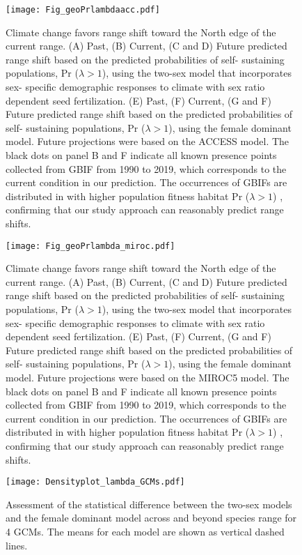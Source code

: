 \documentclass[9pt,twoside,lineno]{pnas-new}
\begin{document}
\begin{figure}
\centering
\texttt{[image: Fig\_geoPrlambdaacc.pdf]}
\caption{Climate change favors range shift toward the North edge of the current range.
			(A) Past, (B) Current, (C and D) Future predicted range shift based on the predicted probabilities of self- sustaining populations, Pr ($\lambda > 1$), using the two-sex model that incorporates sex- specific demographic responses to climate with sex ratio dependent seed fertilization.
			(E) Past, (F) Current, (G and F) Future  predicted range shift based on the predicted probabilities of self- sustaining populations, Pr ($\lambda > 1$), using the female dominant model.
			Future projections were based on the  ACCESS model.
			The black dots on panel B and F indicate all known presence points collected from GBIF from 1990 to 2019, which corresponds to the current condition in our prediction. 
			The occurrences of GBIFs are distributed in with higher population fitness habitat Pr ($\lambda > 1$) , confirming that our study approach can reasonably predict range shifts.}
\label{Sup:geoprojacc}
\end{figure}

\begin{figure}
\centering
\texttt{[image: Fig\_geoPrlambda\_miroc.pdf]}
\caption{Climate change favors range shift toward the North edge of the current range.
			(A) Past, (B) Current, (C and D) Future predicted range shift based on the predicted probabilities of self- sustaining populations, Pr ($\lambda > 1$), using the two-sex model that incorporates sex- specific demographic responses to climate with sex ratio dependent seed fertilization.
			(E) Past, (F) Current, (G and F) Future  predicted range shift based on the predicted probabilities of self- sustaining populations, Pr ($\lambda > 1$), using the female dominant model.
			Future projections were based on the MIROC5 model.
			The black dots on panel B and F indicate all known presence points collected from GBIF from 1990 to 2019, which corresponds to the current condition in our prediction. 
			The occurrences of GBIFs are distributed in with higher population fitness habitat Pr ($\lambda > 1$) , confirming that our study approach can reasonably predict range shifts.}
\label{Sup:geoprojmiroc}
\end{figure}

\begin{figure}
\centering
\texttt{[image: Densityplot\_lambda\_GCMs.pdf]}
\caption{ Assessment of the statistical difference between the two-sex models and the female dominant model across and beyond species range for 4 GCMs. 
			The means for each model are shown as vertical dashed lines. }
\label{Sup:geo_overestimation}
\end{figure}

\newpage


\end{document}
